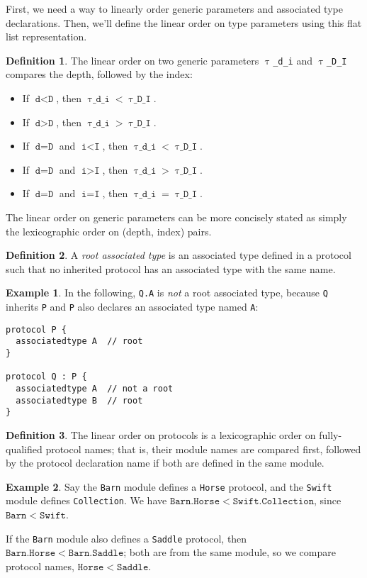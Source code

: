 \documentclass[a4paper,headsepline,bibliography=totoc,toc=flat,fleqn,twoside=semi]{scrbook}
\theoremstyle{definition}
\newtheorem{definition}{Definition}[chapter]
\theoremstyle{definition}
\newtheorem{example}{Example}[chapter]
\theoremstyle{definition}
\newcommand{\ttgp}[2]{\texttt{$\uptau$\_#1\_#2}}
\begin{document}
First, we need a way to linearly order generic parameters and associated type declarations. Then, we'll define the linear order on type parameters using this flat list representation.
\begin{definition}\label{generic parameter order} The linear order on two generic parameters \ttgp{d}{i} and \ttgp{D}{I} compares the depth, followed by the index:
\begin{itemize}
\item If $\texttt{d}<\texttt{D}$, then $\ttgp{d}{i} < \ttgp{D}{I}$.
\item If $\texttt{d}>\texttt{D}$, then $\ttgp{d}{i} > \ttgp{D}{I}$.
\item If $\texttt{d}=\texttt{D}$ and $\texttt{i}<\texttt{I}$, then $\ttgp{d}{i} < \ttgp{D}{I}$.
\item If $\texttt{d}=\texttt{D}$ and $\texttt{i}>\texttt{I}$, then $\ttgp{d}{i} > \ttgp{D}{I}$.
\item If $\texttt{d}=\texttt{D}$ and $\texttt{i}=\texttt{I}$, then $\ttgp{d}{i} = \ttgp{D}{I}$.
\end{itemize}
The linear order on generic parameters can be more concisely stated as simply the lexicographic order on (depth, index) pairs.
\end{definition}

\begin{definition}\label{root associated type} A \emph{root associated type} is an associated type defined in a protocol such that no inherited protocol has an associated type with the same name.
\end{definition}
\begin{example} In the following, \texttt{Q.A} is \emph{not} a root associated type, because \texttt{Q} inherits \texttt{P} and \texttt{P} also declares an associated type named \texttt{A}:
\begin{Verbatim}
protocol P {
  associatedtype A  // root
}

protocol Q : P {
  associatedtype A  // not a root
  associatedtype B  // root
}
\end{Verbatim}
\end{example}
\begin{definition}\label{linear protocol order} The linear order on protocols is a lexicographic order on fully-qualified protocol names; that is, their module names are compared first, followed by the protocol declaration name if both are defined in the same module.
\end{definition}
\begin{example}
Say the \texttt{Barn} module defines a \texttt{Horse} protocol, and the \texttt{Swift} module defines \texttt{Collection}. We have $\mathtt{Barn.Horse}<\mathtt{Swift.Collection}$, since $\mathtt{Barn}<\mathtt{Swift}$.

If the \texttt{Barn} module also defines a \texttt{Saddle} protocol, then $\mathtt{Barn.Horse}<\mathtt{Barn.Saddle}$; both are from the same module, so we compare protocol names, $\mathtt{Horse}<\mathtt{Saddle}$.
\end{example}
\end{document}
